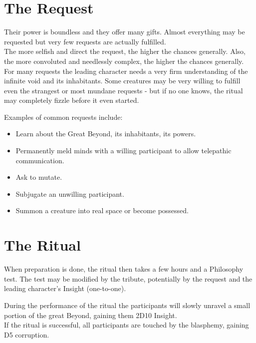 \documentclass[12pt,a4paper,openany]{book}
\begin{document}
	\section{The Request}
	Their power is boundless and they offer many gifts. Almost everything may be requested but very few requests are actually fulfilled.
	\\
	The more selfish and direct the request, the higher the chances generally. Also, the more convoluted and needlessly complex, the higher the chances generally.
	\\
	For many requests the leading character needs a very firm understanding of the infinite void and its inhabitants. 
	Some creatures may be very willing to fulfill even the strangest or most mundane requests - but if no one knows, the ritual may completely fizzle before it even started.
	\par
	Examples of common requests include:
	\begin{itemize}
		\item Learn about the Great Beyond, its inhabitants, its powers.
		\item Permanently meld minds with a willing participant to allow telepathic communication.
		\item Ask to mutate.
		\item Subjugate an unwilling participant.
		\item Summon a creature into real space or become possessed.
	\end{itemize}
	\section{The Ritual}
	When preparation is done, the ritual then takes a few hours and a Philosophy test. The test may be modified by the tribute, potentially by the request and the leading character's Insight (one-to-one).
	\par
	During the performance of the ritual the participants will slowly unravel a small portion of the great Beyond, gaining them 2D10 Insight.\\
	If the ritual is successful, all participants are touched by the blasphemy, gaining D5 corruption.
\end{document}
